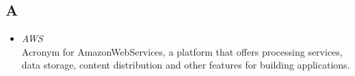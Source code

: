 \subsection*{A}
\begin{itemize}
    \item \textit{AWS} \\ Acronym for AmazonWebServices, a platform that offers processing services, data storage, content distribution and other features for building applications.
\end{itemize}
